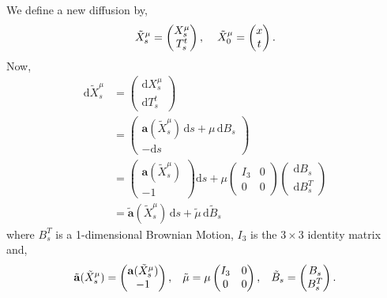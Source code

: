 \documentclass[a4paper,12pt,draft]{report}
\begin{document}
{
We define a new diffusion by,
$$
\tilde{X}_s^\mu = \begin{pmatrix} X_s^\mu \\  T_s^t \end{pmatrix}, \hspace{0.4cm} \tilde{X}_0^\mu = \begin{pmatrix} x \\ t\end{pmatrix}.
$$
Now,
\begin{align}
\mathrm{d}\tilde{X}_s^\mu & = \begin{pmatrix} \mathrm{d}X_s^\mu \\  \mathrm{d}T_s^t \end{pmatrix}\nonumber\\
& = \begin{pmatrix} \mathbf{a}(\tilde{X}_s^\mu)\,\mathrm{d}s + \mu\,\mathrm{d}B_s \\  -\mathrm{d}s\end{pmatrix}\nonumber\\
& = \begin{pmatrix} \mathbf{a}(\tilde{X}_s^\mu) \\ -1 \end{pmatrix}\mathrm{d}s + \mu\begin{pmatrix} I_3 & 0 \\ 0 & 0 \end{pmatrix}\begin{pmatrix} \mathrm{d}B_s \\ \mathrm{d}B_s^T \end{pmatrix}\nonumber\\
& = \tilde{\mathbf{a}}(\tilde{X}_s^\mu)\,\mathrm{d}s + \tilde{\mu}\,\mathrm{d}\tilde{B}_s\nonumber
\end{align}
where $B_s^T$ is a 1-dimensional Brownian Motion, $I_3$ is the $3 \times 3$ identity matrix and,
$$
\tilde{\mathbf{a}}(\tilde{X}_s^\mu) = \begin{pmatrix} \mathbf{a}(\tilde{X}_s^\mu) \\ -1 \end{pmatrix}, \hspace{0.3cm} \tilde{\mu} = \mu\begin{pmatrix} I_3 & 0 \\ 0 & 0 \end{pmatrix}, \hspace{0.3cm} \tilde{B}_s = \begin{pmatrix} B_s \\  B_s^T \end{pmatrix}.
$$}
\end{document}
